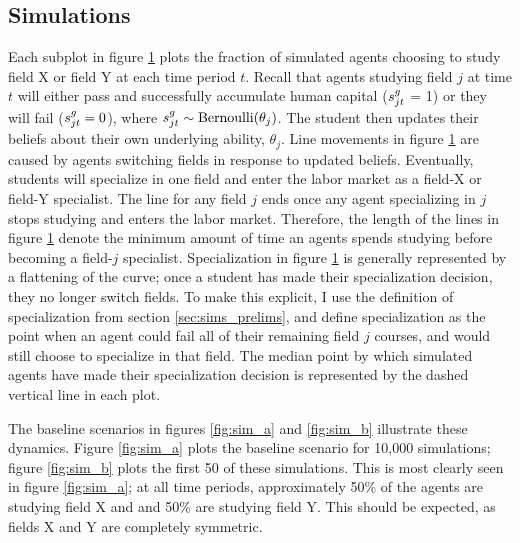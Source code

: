 \subsection{Simulations}\label{sec:sims_plots}

\begin{figure}[t!]
\centering

\label{fig:sim_plots}
\end{figure}
Each subplot in figure \ref{fig:sim_plots} plots the fraction of simulated agents choosing to study field X or field Y at each time period $t$.
Recall that agents studying field $j$ at time $t$ will either pass and successfully accumulate human capital ($s_{jt}^g$ = 1) or they will fail ($s_{jt}^g =0$), where $s_{jt}^g \sim \text{Bernoulli} (\theta_j)$.
The student then updates their beliefs about their own underlying ability, $\theta_j$. 
Line movements in figure \ref{fig:sim_plots} are caused by agents switching fields in response to updated beliefs. 
Eventually, students will specialize in one field and enter the labor market as a field-X or field-Y specialist.
The line for any field $j$ ends once any agent specializing in $j$ stops studying and enters the labor market.
Therefore, the length of the lines in figure \ref{fig:sim_plots} denote the minimum amount of time an agents spends studying before becoming a field-$j$ specialist.
Specialization in figure \ref{fig:sim_plots} is generally represented by a flattening of the curve; once a student has made their specialization decision, they no longer switch fields. 
To make this explicit, I use the definition of specialization from section \ref{sec:sims_prelims}, and define specialization as the point when an agent could fail all of their remaining field $j$ courses, and would still choose to specialize in that field.
The median point by which simulated agents have made their specialization decision is represented by the dashed vertical line in each plot. 

The baseline scenarios in figures \ref{fig:sim_a} and \ref{fig:sim_b} illustrate these dynamics.
Figure \ref{fig:sim_a} plots the baseline scenario for 10,000 simulations; figure \ref{fig:sim_b} plots the first 50 of these simulations. 
This is most clearly seen in figure \ref{fig:sim_a}; at all time periods, approximately 50\% of the agents are studying field X and and 50\% are studying field Y. 
This should be expected, as fields X and Y are completely symmetric.


